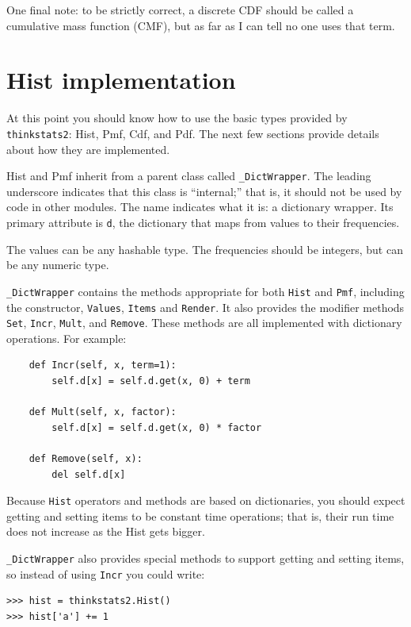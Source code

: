 \documentclass[12pt]{book}
\begin{document}
One final note: to be strictly correct, a discrete CDF should be
called a cumulative mass function (CMF), but as far as I can tell no
one uses that term.  



\section{Hist implementation}

At this point you should know how to use the basic types provided
by {\tt thinkstats2}: Hist, Pmf, Cdf, and Pdf.  The next few sections
provide details about how they are implemented.

Hist and Pmf inherit from a parent class called \verb"_DictWrapper".
The leading underscore indicates that this class is ``internal;'' that
is, it should not be used by code in other modules.  The name
indicates what it is: a dictionary wrapper.  Its primary attribute is
{\tt d}, the dictionary that maps from values to their frequencies.

The values can be any hashable type.  The frequencies should be integers,
but can be any numeric type.

\verb"_DictWrapper" contains the methods appropriate for both
{\tt Hist} and {\tt Pmf}, including the constructor, {\tt Values},
{\tt Items} and {\tt Render}.  It also provides the modifier
methods {\tt Set}, {\tt Incr}, {\tt Mult}, and {\tt Remove}.  These
methods are all implemented with dictionary operations.  For example:

\begin{verbatim}
    def Incr(self, x, term=1):
        self.d[x] = self.d.get(x, 0) + term

    def Mult(self, x, factor):
        self.d[x] = self.d.get(x, 0) * factor

    def Remove(self, x):
        del self.d[x]
\end{verbatim}

Because {\tt Hist} operators and methods are based on dictionaries,
you should expect getting and setting items to be constant time operations;
that is, their run time does not increase as the Hist gets bigger.

\verb"_DictWrapper" also provides special methods to support getting
and setting items, so instead of using {\tt Incr} you could write:

\begin{verbatim}
>>> hist = thinkstats2.Hist()
>>> hist['a'] += 1
\end{verbatim}
\end{document}
